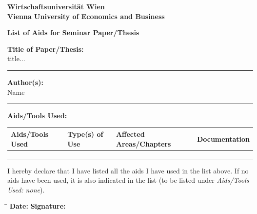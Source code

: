 


\begin{center}
    \textbf{Wirtschaftsuniversität Wien} \\
    \textbf{Vienna University of Economics and Business}
\end{center}

\vspace{1cm}

\begin{center}
    \textbf{List of Aids for Seminar Paper/Thesis}
\end{center}

\vspace{1cm}

\textbf{Title of Paper/Thesis:} \\

title... \\

\rule{\linewidth}{0.4pt}
\vspace{1cm}

\textbf{Author(s):} \\

Name \\
\rule{\linewidth}{0.4pt}

\vspace{1cm}

\textbf{Aids/Tools Used:}

\begin{table}[h]
    \centering
    \begin{tabular}{|l|l|l|p{3.9cm}|}
        \hline
        \textbf{Aids/Tools Used} & \textbf{Type(s) of Use} & \textbf{Affected Areas/Chapters} & \textbf{Documentation} \\ \hline
         \\
        & & & \\
        & & & \\
        \hline
    \end{tabular}
\end{table}

\vspace{2cm}

\noindent I hereby declare that I have listed all the aids I have used in the list above. If no aids have been used, it is also indicated in the list (to be listed under \textit{Aids/Tools Used: none}).

\vspace{2cm}

\begin{tabbing}
    \hspace{5cm} \= \hspace{5cm} \kill
    \textbf{Date:}  \> \textbf{Signature:} \\
\end{tabbing}

